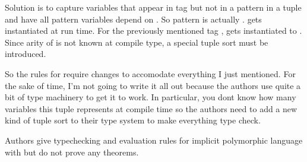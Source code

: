 \documentclass[12pt]{article}	%
\begin{document}
	Solution is to capture variables that appear in tag but not in a pattern in a tuple  and have all pattern variables depend on . So pattern  is actually  .  gets instantiated at run time. For the previously mentioned tag ,  gets instantiated to . Since arity of  is not known at compile type, a special tuple sort must be introduced.
	
	So the rules for \typecase require changes to accomodate everything I just mentioned. For the sake of time, I'm not going to write it all out because the authors use quite a bit of type machinery to get it to work. In particular, you dont know how many variables this tuple represents at compile time so the authors need to add a new kind of tuple sort to their type system to make everything type check.
	
	Authors give typechecking and evaluation rules for implicit polymorphic language with \Dynamic but do not prove any theorems.
	
\end{document}
